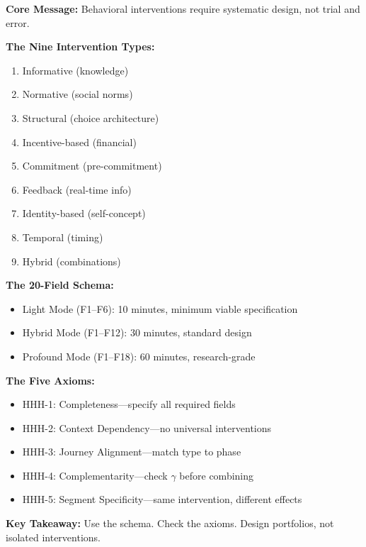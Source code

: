 \begin{tcolorbox}[colback=green!10!white, colframe=green!75!black,
    title=Chapter 17 Summary]

\textbf{Core Message:} Behavioral interventions require systematic design, not trial and error.

\textbf{The Nine Intervention Types:}
\begin{enumerate}[nosep]
\item Informative (knowledge)
\item Normative (social norms)
\item Structural (choice architecture)
\item Incentive-based (financial)
\item Commitment (pre-commitment)
\item Feedback (real-time info)
\item Identity-based (self-concept)
\item Temporal (timing)
\item Hybrid (combinations)
\end{enumerate}

\textbf{The 20-Field Schema:}
\begin{itemize}[nosep]
\item Light Mode (F1--F6): 10 minutes, minimum viable specification
\item Hybrid Mode (F1--F12): 30 minutes, standard design
\item Profound Mode (F1--F18): 60 minutes, research-grade
\end{itemize}

\textbf{The Five Axioms:}
\begin{itemize}[nosep]
\item HHH-1: Completeness---specify all required fields
\item HHH-2: Context Dependency---no universal interventions
\item HHH-3: Journey Alignment---match type to phase
\item HHH-4: Complementarity---check $\gamma$ before combining
\item HHH-5: Segment Specificity---same intervention, different effects
\end{itemize}

\textbf{Key Takeaway:} Use the schema. Check the axioms. Design portfolios, not isolated interventions.

\end{tcolorbox}



